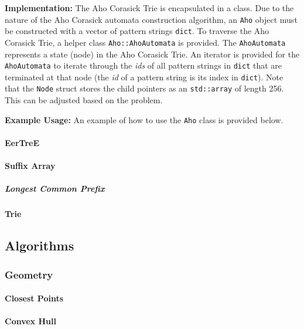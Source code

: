 \documentclass[letterpaper,11pt,twoside]{article}
\newcommand{\PartDivider}[1] {
    \clearpage
    \thispagestyle{empty}
    \vspace*{\stretch{2}}
    \begin{center}
        \part{#1}
    \end{center}
    \vspace*{\stretch{4}}
    \clearpage
}
\begin{document}
                \textbf{Implementation:} The Aho Corasick Trie is encapsulated in a class.
                Due to the nature of the Aho Corasick automata construction algorithm, an \verb|Aho| object must be constructed with a vector of pattern strings \verb|dict|.
                To traverse the Aho Corasick Trie, a helper class \verb|Aho::AhoAutomata| is provided.
                The \verb|AhoAutomata| represents a state (node) in the Aho Corasick Trie.
                An iterator is provided for the \verb|AhoAutomata| to iterate through the \emph{ids} of all pattern strings in \verb|dict| that are terminated at that node (the \emph{id} of a pattern string is its index in \verb|dict|).
                Note that the \verb|Node| struct stores the child pointers as an \verb|std::array| of length 256.
                This can be adjusted based on the problem.
                

                \textbf{Example Usage:} An example of how to use the \verb|Aho| class is provided below.
                
            \subsection{EerTreE}
            \subsection{Suffix Array}
                \subsubsection{Longest Common Prefix}
            \subsection{Trie} \label{trie}


    \PartDivider{Algorithms}
        \section{Geometry}
            \subsection{Closest Points}
            \subsection{Convex Hull}
\end{document}
